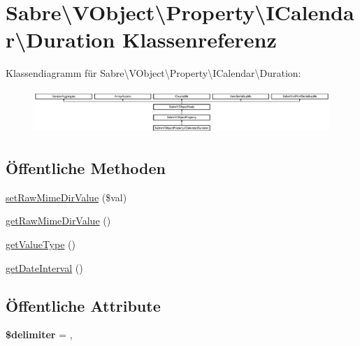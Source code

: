 \hypertarget{class_sabre_1_1_v_object_1_1_property_1_1_i_calendar_1_1_duration}{}\section{Sabre\textbackslash{}V\+Object\textbackslash{}Property\textbackslash{}I\+Calendar\textbackslash{}Duration Klassenreferenz}
\label{class_sabre_1_1_v_object_1_1_property_1_1_i_calendar_1_1_duration}
Klassendiagramm für Sabre\textbackslash{}V\+Object\textbackslash{}Property\textbackslash{}I\+Calendar\textbackslash{}Duration\+:\begin{figure}[H]
\begin{center}
\leavevmode
\includegraphics[height=1.671642cm]{class_sabre_1_1_v_object_1_1_property_1_1_i_calendar_1_1_duration}
\end{center}
\end{figure}
\subsection*{Öffentliche Methoden}
\begin{DoxyCompactItemize}
\item 
\mbox{\hyperlink{class_sabre_1_1_v_object_1_1_property_1_1_i_calendar_1_1_duration_afc316b01ce159a154b46ebb954a91eaf}{set\+Raw\+Mime\+Dir\+Value}} (\$val)
\item 
\mbox{\hyperlink{class_sabre_1_1_v_object_1_1_property_1_1_i_calendar_1_1_duration_a1676cec5b80f81db0c77ad6afc25bcb0}{get\+Raw\+Mime\+Dir\+Value}} ()
\item 
\mbox{\hyperlink{class_sabre_1_1_v_object_1_1_property_1_1_i_calendar_1_1_duration_a348276ab3887dfabe0621a2e50d9e15e}{get\+Value\+Type}} ()
\item 
\mbox{\hyperlink{class_sabre_1_1_v_object_1_1_property_1_1_i_calendar_1_1_duration_ab97ada3c1d6a9becbb9477ec73a9a764}{get\+Date\+Interval}} ()
\end{DoxyCompactItemize}
\subsection*{Öffentliche Attribute}
\begin{DoxyCompactItemize}
\item 
\mbox{\label{class_sabre_1_1_v_object_1_1_property_1_1_i_calendar_1_1_duration_a7f996febf50f82874f1a70a1a5390716}} 
{\bfseries \$delimiter} = \textquotesingle{},\textquotesingle{}
\end{DoxyCompactItemize}

